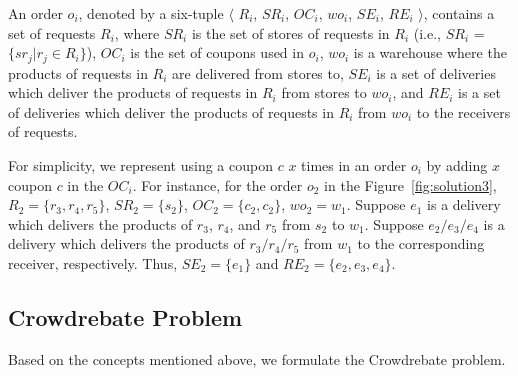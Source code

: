 \begin{definition}[An order]
	An order $o_i$, denoted by a six-tuple $\langle$ $R_i$, $SR_i$, $OC_i$, $wo_i$, $SE_i$, $RE_i$ $\rangle$, contains a set of requests $R_i$, where $SR_i$ is the set of stores of requests in $R_i$ (i.e., $SR_i$ = $\{sr_j|r_j \in R_i\}$), $OC_i$ is the set of coupons used in $o_i$, $wo_i$ is a warehouse where the products of requests in $R_i$ are delivered from stores to, $SE_i$ is a set of deliveries which deliver the products of requests in $R_i$ from stores to $wo_i$, and $RE_i$ is a set of deliveries which deliver the products of requests in $R_i$ from $wo_i$ to the receivers of requests.
	
	\label{definition2}
\end{definition}

For simplicity, we represent using a coupon $c$ $x$ times in an order $o_i$ by adding $x$ coupon $c$ in the $OC_i$. For instance, for the order $o_2$ in the Figure~\ref{fig:solution3}, $R_2 = \{r_3, r_4, r_5\}$, $SR_2 = \{s_2\}$, $OC_2 = \{c_2, c_2\}$, $wo_2 = w_1$. Suppose $e_1$ is a delivery which delivers the products of $r_3$, $r_4$, and $r_5$ from $s_2$ to $w_1$. Suppose $e_2/e_3/e_4$ is a delivery which delivers the products of $r_3/r_4/r_5$ from $w_1$ to the corresponding receiver, respectively. Thus, $SE_2 = \{e_1\}$ and $RE_2 = \{e_2, e_3, e_4\}$. 

\subsection{Crowdrebate Problem}

Based on the concepts mentioned above, we formulate the Crowdrebate problem.

